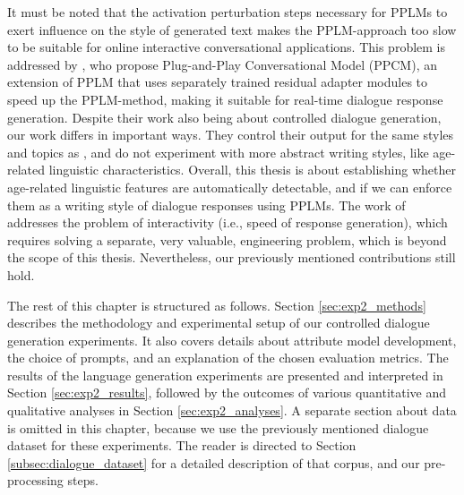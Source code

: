 It must be noted that the activation perturbation steps necessary for PPLMs to exert influence on the style of generated text makes the PPLM-approach too slow to be suitable for online interactive conversational applications. This problem is addressed by \cite{madotto-etal-2020-plug}, who propose Plug-and-Play Conversational Model (PPCM), an extension of PPLM that uses separately trained residual adapter modules to speed up the PPLM-method, making it suitable for real-time dialogue response generation. Despite their work also being about controlled dialogue generation, our work differs in important ways. They control their output for the same styles and topics as \cite{dathathri2019plug}, and do not experiment with more abstract writing styles, like age-related linguistic characteristics. Overall, this thesis is about establishing whether age-related linguistic features are automatically detectable, and if we can enforce them as a writing style of dialogue responses using PPLMs. The work of \cite{madotto-etal-2020-plug} addresses the problem of interactivity (i.e., speed of response generation), which requires solving a separate, very valuable, engineering problem, which is beyond the scope of this thesis. Nevertheless, our previously mentioned contributions still hold.

The rest of this chapter is structured as follows. Section \ref{sec:exp2_methods} describes the methodology and experimental setup of our controlled dialogue generation experiments. It also covers details about attribute model development, the choice of prompts, and an explanation of the chosen evaluation metrics. The results of the language generation experiments are presented and interpreted in Section \ref{sec:exp2_results}, followed by the outcomes of various quantitative and qualitative analyses in Section \ref{sec:exp2_analyses}. A separate section about data is omitted in this chapter, because we use the previously mentioned dialogue dataset for these experiments. The reader is directed to Section \ref{subsec:dialogue_dataset} for a detailed description of that corpus, and our pre-processing steps.


